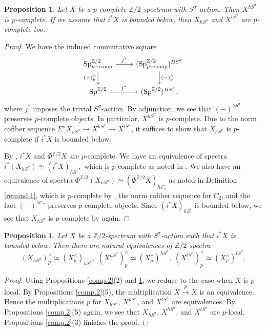 \documentclass[10pt]{amsart}
\newtheorem{prop}[thm]{Proposition}
\theoremstyle{definition}
\numberwithin{equation}{section}
\newcommand{\Z}{\mathbb{Z}}
\newcommand{\Sp}{\mathrm{Sp}}
\newcommand{\comp}{\mathrm{comp}}
\begin{document}
{\begin{prop}
\label{comp.3}
Let $X$ be a $p$-complete $\Z/2$-spectrum with $S^\sigma$-action.
Then $X^{hS^\sigma}$ is $p$-complete.
If we assume that $i^*X$ is bounded below,
then $X_{hS^\sigma}$ and $X^{tS^\sigma}$ are $p$-complete too.
\end{prop}
\begin{proof}
We have the induced commutative square
\[
\begin{tikzcd}
\Sp_{p-\comp}^{\Z/2}\ar[d,"(-)_p^\wedge"']\ar[r,"j^*"]&
(\Sp_{p-\comp}^{\Z/2})^{BS^\sigma}\ar[d,"(-)_p^\wedge"]
\\
\Sp^{\Z/2}\ar[r,"j^*"]&
(\Sp^{\Z/2})^{BS^\sigma},
\end{tikzcd}
\]
where $j^*$ imposes the trivial $S^\sigma$-action.
By adjunction,
we see that $(-)^{hS^\sigma}$ preserves $p$-complete objects.
In particular,
$X^{hS^\sigma}$ is $p$-complete.
Due to the norm cofiber sequence $\Sigma^\sigma X_{hS^\sigma}\to X^{hS^\sigma}\to X^{tS^\sigma}$,
it suffices to show that $X_{hS^\sigma}$ is $p$-complete if $i^*X$ is bounded below.

By \cite[Lemma 3.16]{QS22},
$i^*X$ and $\Phi^{\Z/2}X$ are $p$-complete.
We have an equivalence of spectra
\(
i^*(X_{hS^\sigma})\simeq (i^*X)_{hS^1},
\)
which is $p$-complete as noted in \cite[p.\ 216]{BMS19}.
We also have an equivalence of spectra
\(
\Phi^{\Z/2} (X_{hS^\sigma})\simeq (\Phi^{\Z/2}X)_{hC_2}
\)
as noted in Definition \ref{remind.1},
which is $p$-complete by \cite[Lemma I.2.9]{NS}, the norm cofiber sequence for $C_2$, and the fact $(-)^{hC_2}$ preserves $p$-complete objects.
Since $(i^*X)_{hS^1}$ is bounded below,
we see that $X_{hS^\sigma}$ is $p$-complete by \cite[Lemma 3.16]{QS22} again.
\end{proof}

\begin{prop}
\label{comp.4}
Let $X$ be a $\Z/2$-spectrum with $S^\sigma$-action such that $i^*X$ is bounded below.
Then there are natural equivalences of $\Z/2$-spectra
\[
(X_{hS^\sigma})_p^\wedge \simeq (X_p^\wedge)_{h S^\sigma},
\;
(X^{hS^\sigma})_p^\wedge \simeq (X_p^\wedge)^{h S^\sigma},
\;
(X^{tS^\sigma})_p^\wedge \simeq (X_p^\wedge)^{t S^\sigma}.
\]
\end{prop}
\begin{proof}
Using Propositions \ref{comp.2}(2) and \ref{comp.3},
we reduce to the case when $X$ is $p$-local.
By Propositions \ref{comp.2}(5),
the multiplication $X\xrightarrow{p} X$ is an equivalence.
Hence the multiplications $p$ for $X_{hS^\sigma}$, $X^{hS^\sigma}$, and $X^{tS^\sigma}$ are equivalences.
By Propositions \ref{comp.2}(5) again,
we see that $X_{hS^\sigma}$, $X^{hS^\sigma}$, and $X^{tS^\sigma}$ are $p$-local.
Propositions \ref{comp.2}(3) finishes the proof.
\end{proof}

}
\end{document}
